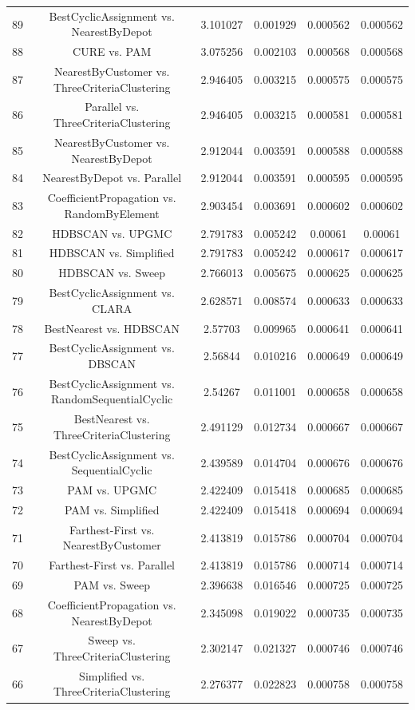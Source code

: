 \documentclass[a4paper,10pt]{article}
\begin{document}
\begin{landscape}
\begin{table}[!htp]
\begin{tabular}{cccccc}
89&BestCyclicAssignment vs. NearestByDepot&3.101027&0.001929&0.000562&0.000562\\
88&CURE vs. PAM&3.075256&0.002103&0.000568&0.000568\\
87&NearestByCustomer vs. ThreeCriteriaClustering&2.946405&0.003215&0.000575&0.000575\\
86&Parallel vs. ThreeCriteriaClustering&2.946405&0.003215&0.000581&0.000581\\
85&NearestByCustomer vs. NearestByDepot&2.912044&0.003591&0.000588&0.000588\\
84&NearestByDepot vs. Parallel&2.912044&0.003591&0.000595&0.000595\\
83&CoefficientPropagation vs. RandomByElement&2.903454&0.003691&0.000602&0.000602\\
82&HDBSCAN vs. UPGMC&2.791783&0.005242&0.00061&0.00061\\
81&HDBSCAN vs. Simplified&2.791783&0.005242&0.000617&0.000617\\
80&HDBSCAN vs. Sweep&2.766013&0.005675&0.000625&0.000625\\
79&BestCyclicAssignment vs. CLARA&2.628571&0.008574&0.000633&0.000633\\
78&BestNearest vs. HDBSCAN&2.57703&0.009965&0.000641&0.000641\\
77&BestCyclicAssignment vs. DBSCAN&2.56844&0.010216&0.000649&0.000649\\
76&BestCyclicAssignment vs. RandomSequentialCyclic&2.54267&0.011001&0.000658&0.000658\\
75&BestNearest vs. ThreeCriteriaClustering&2.491129&0.012734&0.000667&0.000667\\
74&BestCyclicAssignment vs. SequentialCyclic&2.439589&0.014704&0.000676&0.000676\\
73&PAM vs. UPGMC&2.422409&0.015418&0.000685&0.000685\\
72&PAM vs. Simplified&2.422409&0.015418&0.000694&0.000694\\
71&Farthest-First vs. NearestByCustomer&2.413819&0.015786&0.000704&0.000704\\
70&Farthest-First vs. Parallel&2.413819&0.015786&0.000714&0.000714\\
69&PAM vs. Sweep&2.396638&0.016546&0.000725&0.000725\\
68&CoefficientPropagation vs. NearestByDepot&2.345098&0.019022&0.000735&0.000735\\
67&Sweep vs. ThreeCriteriaClustering&2.302147&0.021327&0.000746&0.000746\\
66&Simplified vs. ThreeCriteriaClustering&2.276377&0.022823&0.000758&0.000758\\

\end{tabular}
\end{table}
\end{landscape}
\end{document}
